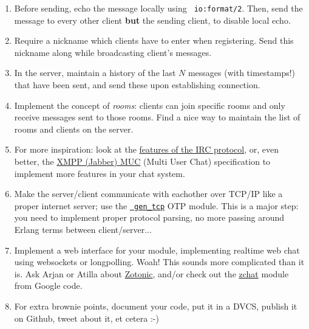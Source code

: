 \documentclass{article}
\begin{document}
\begin{enumerate}

\item Before sending, echo the message locally using {\tt
  io:format/2}. Then, send the message to every other client {\bf but}
  the sending client, to disable local echo.

\item Require a nickname which clients have to enter when
  registering. Send this nickname along while broadcasting client's
  messages.

\item In the server, maintain a history of the last $N$ messages (with
  timestamps!) that have been sent, and send these upon establishing
  connection.

\item Implement the concept of {\em rooms}: clients can join specific
  rooms and only receive messages sent to those rooms. Find a nice way
  to maintain the list of rooms and clients on the server.

\item For more inspiration: look at the
  \href{http://tools.ietf.org/html/rfc1459#section-3}{features of the
    IRC protocol}, or, even better, the
  \href{http://xmpp.org/extensions/xep-0045.html}{XMPP (Jabber) MUC}
  (Multi User Chat) specification to implement more features in your
  chat system.

\item Make the server/client communicate with eachother over TCP/IP
  like a proper internet server; use the
  \href{http://ftp.csd.uu.se/pub/mirror/erlang/doc/man/gen\_tcp.html}{{\tt
      gen\_tcp}} OTP module. This is a major step: you need to
  implement proper protocol parsing, no more passing around Erlang
  terms between client/server...

\item Implement a web interface for your module, implementing realtime
  web chat using websockets or longpolling. Woah! This sounds more
  complicated than it is. Ask Arjan or Atilla about \href{http://zotonic.com/}{Zotonic}, and/or
  check out the \href{http://code.google.com/p/zchat/}{zchat} module from Google code.

 \item For extra brownie points, document your code, put it in a DVCS,
   publish it on Github, tweet about it, et cetera :-)

\end{enumerate}
\end{document}
